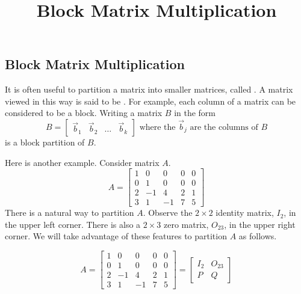 \documentclass{ximera}
\title{Block Matrix Multiplication} \license{CC BY-NC-SA 4.0}
\begin{document}
\begin{abstract}

\end{abstract}
\maketitle

\begin{onlineOnly}
\section*{Block Matrix Multiplication}
\end{onlineOnly}

It is often useful to partition a matrix into smaller matrices, called . A matrix viewed in this way is said to be .  For example, each column of a matrix can be considered to be a block.  Writing a matrix $B$ in the form
\begin{equation*}
B = \begin{bmatrix}
\vec{b}_{1} & \vec{b}_{2} & \ldots & \vec{b}_{k}
\end{bmatrix} \mbox{ where the } \vec{b}_{j} \mbox{ are the columns of } B
\end{equation*}
is a block partition of $B$. 

Here is another example.  Consider matrix $A$.
\begin{equation*}
A = \left[ \begin{array}{rrrrr}
1 & 0 & 0 & 0 & 0 \\
0 & 1 & 0 & 0 & 0 \\
2 & -1 & 4 & 2 & 1 \\
3 & 1 & -1 & 7 & 5
\end{array} \right]
\end{equation*}
There is a natural way to partition $A$. Observe the $2\times 2$ identity matrix, $I_2$, in the upper left corner.  There is also a $2\times 3$ zero matrix, $O_{23}$, in the upper right corner.  We will take advantage of these features to partition $A$ as follows.

\begin{equation*}
A = \left[ \begin{array}{rr|rrr}
1 & 0 & 0 & 0 & 0 \\
0 & 1 & 0 & 0 & 0 \\
\hline
2 & -1 & 4 & 2 & 1 \\
3 & 1 & -1 & 7 & 5
\end{array} \right] = \left[ \begin{array}{cc}
I_{2} & O_{23} \\
P & Q
\end{array} \right]
\end{equation*}
\end{document}
